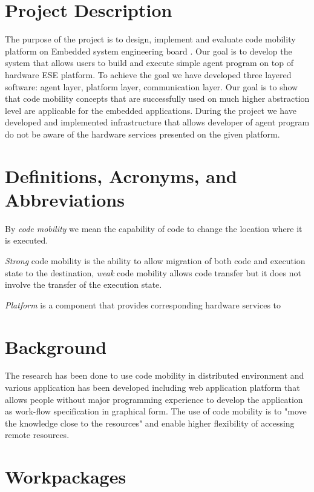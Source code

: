 \documentclass{scrreprt}
\begin{document}
	\section{Project Description}

The purpose of the project is to design, implement and evaluate code mobility platform on Embedded system engineering board \cite{galler}.
Our goal is to develop the system that allows users to build and execute simple agent program on top of  hardware ESE platform.
To achieve the goal we have developed three layered software: agent layer, platform layer, communication layer.
Our goal is to show that code mobility concepts that are successfully used on much higher abstraction level are applicable for the embedded applications.
During the project we have developed and implemented infrastructure that allows developer of agent program do not be aware of the hardware services presented on the given platform.


	\section{Definitions, Acronyms, and Abbreviations}

By \emph{code mobility} we mean the capability of code to change the location where it is executed.

\vspace{0.1in}
\emph{Strong} code mobility is the ability to allow migration of both code and execution state to the destination, \emph{weak} code mobility allows code transfer but it does not involve the transfer of the execution state.

\vspace{0.1in}
\emph{Platform} is a component that provides corresponding hardware services to 

	\section{Background}

The research has been done to use code mobility in distributed environment \cite{Bart1} and various application has been developed including \cite{Bart2} web application platform that allows people without major programming experience to develop the application as work-flow specification in graphical form. The use of code mobility is to "move the knowledge close to the resources" \cite{Picco} and enable higher flexibility of accessing remote resources.

	\section{Workpackages}
\end{document}
